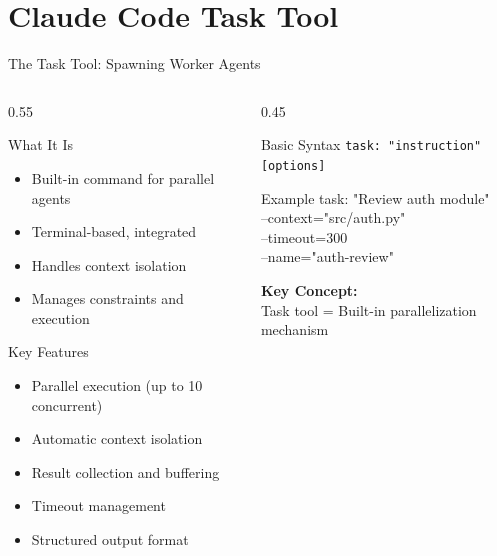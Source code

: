\documentclass[aspectratio=169,11pt]{beamer}
\begin{document}
\section{Claude Code Task Tool}

\begin{frame}{The Task Tool: Spawning Worker Agents}
\begin{columns}[T]
\begin{column}{0.55\textwidth}
\begin{block}{What It Is}
\begin{itemize}
    \item Built-in command for parallel agents
    \item Terminal-based, integrated
    \item Handles context isolation
    \item Manages constraints and execution
\end{itemize}
\end{block}

\begin{exampleblock}{Key Features}
\begin{itemize}
    \item Parallel execution (up to 10 concurrent)
    \item Automatic context isolation
    \item Result collection and buffering
    \item Timeout management
    \item Structured output format
\end{itemize}
\end{exampleblock}
\end{column}
\begin{column}{0.45\textwidth}
\begin{block}{Basic Syntax}
\texttt{\textcolor{UofSCGarnet}{task:} "instruction" [options]}
\end{block}

\begin{exampleblock}{Example}
{\scriptsize\ttfamily
\textcolor{UofSCGarnet}{task:} "Review auth module"\\
\hspace{1em}--context="src/auth.py"\\
\hspace{1em}--timeout=300\\
\hspace{1em}--name="auth-review"
}
\end{exampleblock}

\vspace{0.3cm}
\textbf{Key Concept:}\\
Task tool = Built-in parallelization mechanism
\end{column}
\end{columns}
\end{frame}
\end{document}
